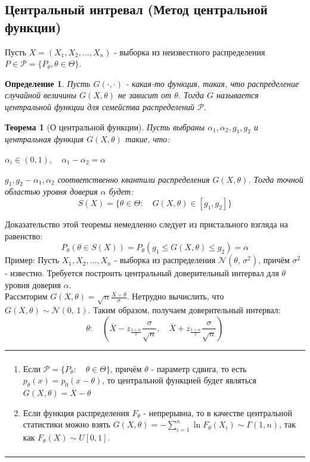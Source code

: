 \documentclass[a4paper,12pt]{article}
\newcommand{\normal}[2]{\mathcal{N}(#1,\,#2)}
\newcommand{\sumin}{\sum\limits_{i=1}^n}
\newcommand{\sample}{X_1, X_2, ..., X_n}
\newenvironment{annotation}{\begin{center}
    \begin{tabular}{|p{0.9\textwidth}|}
    \hline\\
}
{ 
    \\\\\hline
    \end{tabular} 
    \end{center}
}
\newtheorem{dfn}{Определение}[section]
\theoremstyle{named}
\newtheorem*{namedtheorem}{Теорема}
\begin{document}
\subsection{Центральный интревал (Метод центральной функции)}
Пусть $X = (\sample)$ - выборка из неизвестного распределения $P \in \mathcal{P} = \{P_\theta, \theta \in \Theta \}$.
\begin{dfn}
    Пусть $G(\cdot, \cdot)$ - какая-то функция, такая, что распределение случайной величины $G(X, \theta)$ не зависит от $\theta$.
    Тогда $G$ называется центральной функции для семейства распределений $\mathcal{P}$.
\end{dfn}
\begin{namedtheorem}[О центральной функции]
    Пусть выбраны $\alpha_1, \alpha_2, g_1, g_2$ и центральная функция $G(X, \theta)$ такие, что:
    \item $\alpha_i \in (0, 1), \quad \alpha_1 - \alpha_2 = \alpha$
    \item $g_1, g_2 - \alpha_1, \alpha_2$ соответственно квантили распределения $G(X, \theta)$.
    Тогда точной областью уровня доверия $\alpha$ будет:
    $$
        S(X) = \{ \theta \in \Theta: \quad G(X, \theta) \in [g_1, g_2] \}
    $$
\end{namedtheorem}
Доказательство этой теоремы немедленно следует из пристального взгляда на равенство:
$$
    P_\theta(\theta \in S(X)) = P_\theta(g_1 \leq G(X, \theta) \leq g_2) = \alpha
$$
Пример: Пусть $\sample$ - выборка из распределения $\normal{\theta}{\sigma^2}$, причём $\sigma^2$ - известно. Требуется 
построить центральный доверительный интервал для $\theta$ уровня доверия $\alpha$. \\
Рассмторим $G(X, \theta) = \sqrt{n}\frac{\overline{X} - \theta}{\sigma}$. Нетрудно вычислить, 
что $G(X, \theta) \sim \normal{0}{1}$. Таким образом, получаем доверительный интервал:
$$
    \theta: \quad \left(\overline{X} - z_{\frac{1+\alpha}{2}}\frac{\sigma}{\sqrt{n}}, \quad 
    \overline{X} + z_{\frac{1+\alpha}{2}}\frac{\sigma}{\sqrt{n}}\right)
$$
\begin{annotation}
    \begin{enumerate}
        \item Если $\mathcal{P} = \{ P_\theta: \quad \theta \in \Theta \}$, причём $\theta$ - параметр сдвига, то есть 
        $p_\theta(x) = p_0(x-\theta)$, то центральной функцией будет являться $G(X, \theta) = \overline{X} - \theta$
        \item Если функция распределения $F_\theta$ - непрерывна, то в качестве центральной статистики можно взять 
        $G(X, \theta) = -\sumin \ln F_\theta(X_i) \sim \Gamma(1, n)$, так как $F_\theta(X) \sim U[0, 1]$.
    \end{enumerate}
\end{annotation}
\end{document}
